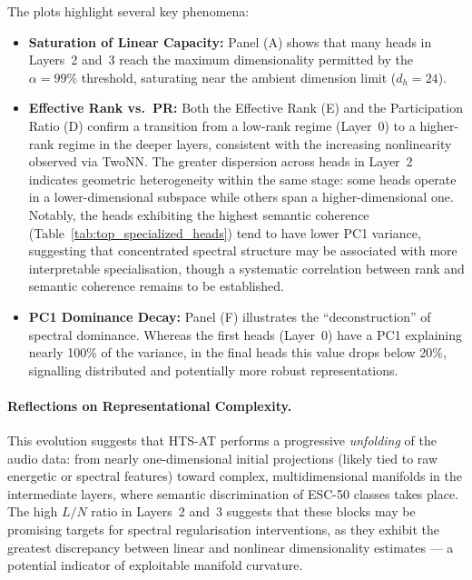 The plots highlight several key phenomena:
\begin{itemize}
    \item \textbf{Saturation of Linear Capacity:} Panel (A) shows that many
    heads in Layers~2 and~3 reach the maximum dimensionality permitted by the
    $\alpha=99\%$ threshold, saturating near the ambient dimension limit
    ($d_h=24$).
    \item \textbf{Effective Rank vs.\ PR:} Both the Effective Rank (E) and
    the Participation Ratio (D) confirm a transition from a low-rank regime
    (Layer~0) to a higher-rank regime in the deeper layers, consistent with
    the increasing nonlinearity observed via TwoNN. The greater dispersion
    across heads in Layer~2 indicates geometric heterogeneity within the
    same stage: some heads operate in a lower-dimensional subspace while
    others span a higher-dimensional one. Notably, the heads exhibiting the
    highest semantic coherence (Table~\ref{tab:top_specialized_heads}) tend
    to have lower PC1 variance, suggesting that concentrated spectral
    structure may be associated with more interpretable specialisation,
    though a systematic correlation between rank and semantic coherence
    remains to be established.
    \item \textbf{PC1 Dominance Decay:} Panel (F) illustrates the
    ``deconstruction'' of spectral dominance. Whereas the first heads
    (Layer~0) have a PC1 explaining nearly 100\% of the variance, in the
    final heads this value drops below 20\%, signalling distributed and
    potentially more robust representations.
\end{itemize}
 
\paragraph{Reflections on Representational Complexity.}
This evolution suggests that HTS-AT performs a progressive \emph{unfolding}
of the audio data: from nearly one-dimensional initial projections (likely
tied to raw energetic or spectral features) toward complex, multidimensional
manifolds in the intermediate layers, where semantic discrimination of
ESC-50 classes takes place. The high $L/N$ ratio in Layers~2 and~3 suggests that these blocks 
may be promising targets for spectral regularisation interventions, 
as they exhibit the greatest discrepancy between linear and nonlinear 
dimensionality estimates — a potential indicator of exploitable manifold curvature.
 
